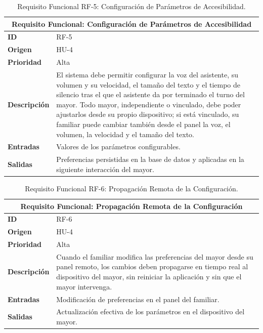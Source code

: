 \begin{table}[htbp]
    \centering
    \caption{Requisito Funcional RF-5: Configuración de Parámetros de Accesibilidad.}
    \label{tab:rf5}
    \renewcommand{\arraystretch}{1.3}
    \begin{tabular}{|l|>{\raggedright\arraybackslash}p{}|}
        \hline
        \multicolumn{2}{|c|}{\textbf{Requisito Funcional: Configuración de Parámetros de Accesibilidad}} \\
        \hline
        \textbf{ID} & RF-5 \\
        \hline
        \textbf{Origen} & HU-4 \\
        \hline
        \textbf{Prioridad} & Alta \\
        \hline
        \textbf{Descripción} & El sistema debe permitir configurar la voz del asistente, su volumen y su velocidad, el tamaño del texto y el tiempo de silencio tras el que el asistente da por terminado el turno del mayor. Todo mayor, independiente o vinculado, debe poder ajustarlos desde su propio dispositivo; si está vinculado, su familiar puede cambiar también desde el panel la voz, el volumen, la velocidad y el tamaño del texto. \\
        \hline
        \textbf{Entradas} & Valores de los parámetros configurables. \\
        \hline
        \textbf{Salidas} & Preferencias persistidas en la base de datos y aplicadas en la siguiente interacción del mayor. \\
        \hline
    \end{tabular}

\end{table}

\begin{table}[htbp]
    \centering
    \caption{Requisito Funcional RF-6: Propagación Remota de la Configuración.}
    \label{tab:rf6}
    \renewcommand{\arraystretch}{1.3}
    \begin{tabular}{|l|>{\raggedright\arraybackslash}p{}|}
        \hline
        \multicolumn{2}{|c|}{\textbf{Requisito Funcional: Propagación Remota de la Configuración}} \\
        \hline
        \textbf{ID} & RF-6 \\
        \hline
        \textbf{Origen} & HU-4 \\
        \hline
        \textbf{Prioridad} & Alta \\
        \hline
        \textbf{Descripción} & Cuando el familiar modifica las preferencias del mayor desde su panel remoto, los cambios deben propagarse en tiempo real al dispositivo del mayor, sin reiniciar la aplicación y sin que el mayor intervenga. \\
        \hline
        \textbf{Entradas} & Modificación de preferencias en el panel del familiar. \\
        \hline
        \textbf{Salidas} & Actualización efectiva de los parámetros en el dispositivo del mayor. \\
        \hline
    \end{tabular}

\end{table}


